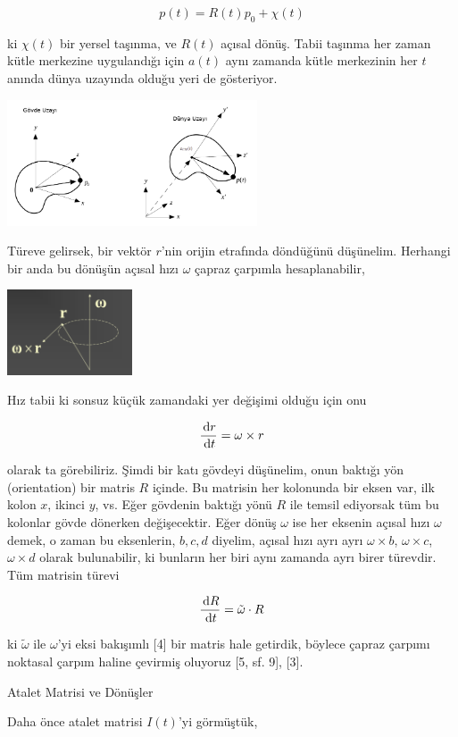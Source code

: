 \documentclass[12pt,fleqn]{article}\usepackage{../../common}
\begin{document}
$$
p(t) = R(t) p_0 + \chi(t)
$$

ki $\chi(t)$ bir yersel taşınma, ve $R(t)$ açısal dönüş. Tabii taşınma her zaman
kütle merkezine uygulandığı için $a(t)$ aynı zamanda kütle merkezinin her $t$
anında dünya uzayında olduğu yeri de gösteriyor.

\includegraphics[width=20em]{phy_005_basics_04_04.png}

Türeve gelirsek, bir vektör $r$'nin orijin etrafında döndüğünü
düşünelim. Herhangi bir anda bu dönüşün açısal hızı $\omega$ çapraz çarpımla
hesaplanabilir,

\includegraphics[width=10em]{phy_005_basics_04_03.png}

Hız tabii ki sonsuz küçük zamandaki yer değişimi olduğu için onu

$$
\frac{\,\mathrm{d} r}{\,\mathrm{d} t} = \omega \times r
$$

olarak ta görebiliriz. Şimdi bir katı gövdeyi düşünelim, onun baktığı yön
(orientation) bir matris $R$ içinde. Bu matrisin her kolonunda bir eksen var,
ilk kolon $x$, ikinci $y$, vs. Eğer gövdenin baktığı yönü $R$ ile temsil
ediyorsak tüm bu kolonlar gövde dönerken değişecektir. Eğer dönüş $\omega$ ise
her eksenin açısal hızı $\omega$ demek, o zaman bu eksenlerin, $b,c,d$ diyelim,
açısal hızı ayrı ayrı $\omega \times b$, $\omega \times c$, $\omega \times d$
olarak bulunabilir, ki bunların her biri aynı zamanda ayrı birer türevdir. Tüm
matrisin türevi

$$
\frac{\,\mathrm{d} R}{\,\mathrm{d} t} = \tilde \omega \cdot R
$$

ki $\tilde \omega$ ile $\omega$'yi eksi bakışımlı [4] bir matris hale getirdik,
böylece çapraz çarpımı noktasal çarpım haline çevirmiş oluyoruz [5, sf. 9], [3].

Atalet Matrisi ve Dönüşler

Daha önce atalet matrisi $I(t)$'yi görmüştük,
\end{document}
